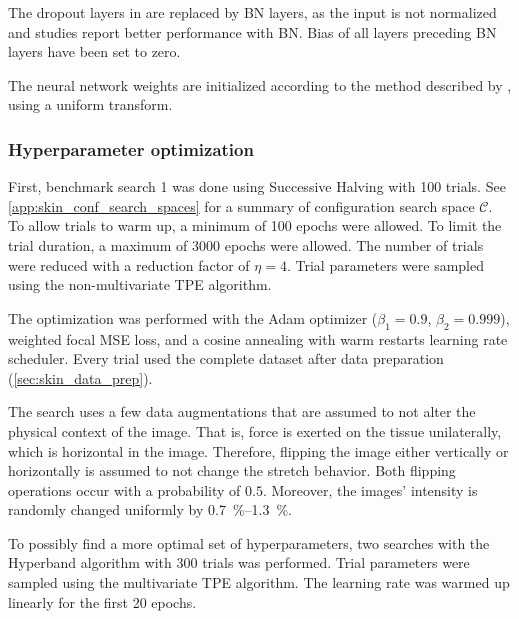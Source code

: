 The dropout layers in  are replaced by BN layers, as the input is not normalized and studies report better performance with BN.
Bias of all layers preceding BN layers have been set to zero.

The neural network weights are initialized according to the method described by \textcite{He2015a}, using a uniform transform.

\subsubsection{Hyperparameter optimization}
First, benchmark search 1 was done using Successive Halving with 100 trials.
See \cref{app:skin_conf_search_spaces} for a summary of configuration search space $\mathcal{C}$.
To allow trials to warm up, a minimum of 100 epochs were allowed.
To limit the trial duration, a maximum of 3000 epochs were allowed.
The number of trials were reduced with a reduction factor of $\eta=4$.
Trial parameters were sampled using the non-multivariate TPE algorithm.

The optimization was performed with the Adam optimizer ($\beta_1=0.9$, $\beta_2=0.999$), weighted focal MSE loss, and a cosine annealing with warm restarts learning rate scheduler.
Every trial used the complete dataset after data preparation (\cref{sec:skin_data_prep}).

The search uses a few data augmentations that are assumed to not alter the physical context of the image.
That is, force is exerted on the tissue unilaterally, which is horizontal in the image.
Therefore, flipping the image either vertically or horizontally is assumed to not change the stretch behavior.
Both flipping operations occur with a probability of $0.5$.
Moreover, the images' intensity is randomly changed uniformly by \qtyrange{0.7}{1.3}{\percent}.

To possibly find a more optimal set of hyperparameters, two searches with the Hyperband algorithm with 300 trials was performed.
Trial parameters were sampled using the multivariate TPE algorithm.
The learning rate was warmed up linearly for the first 20 epochs.


